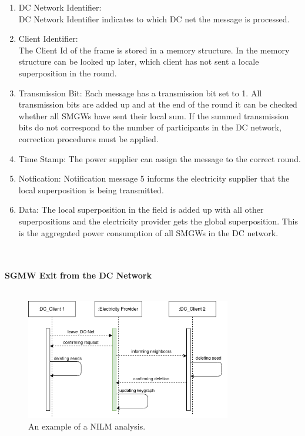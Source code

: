 \begin{enumerate}
\item DC Network Identifier:\\
DC Network Identifier indicates to which DC net the message is processed.
\item Client Identifier:\\
The Client Id of the frame is stored in a memory structure. In the memory structure can be looked up later, which client has not sent a locale superposition in the round.
\item Transmission Bit: Each message has a transmission bit set to 1. All transmission bits are added up and at the end of the round it can be checked whether all SMGWs have sent their local sum. If the summed transmission bits do not correspond to the number of participants in the DC network, correction procedures must be applied.
\item Time Stamp: The power supplier can assign the message to the correct round.
\item Notfication: Notification message 5 informs the electricity supplier that the local superposition is being transmitted.
\item Data:
The local superposition in the field is added up with all other superpositions and the electricity provider gets the global superposition. This is the aggregated power consumption of all SMGWs in the DC network.
\end{enumerate}
\\
\\
\textbf{SGMW Exit from the DC Network}
\\
\\
\begin{figure}[tbp]
  \centering
  \includegraphics[width=0.8\textwidth]{images/Exit.png}
  \caption[Short description]{An example of a NILM analysis.}
  \label{fig:Appliance_Model}
\end{figure}
